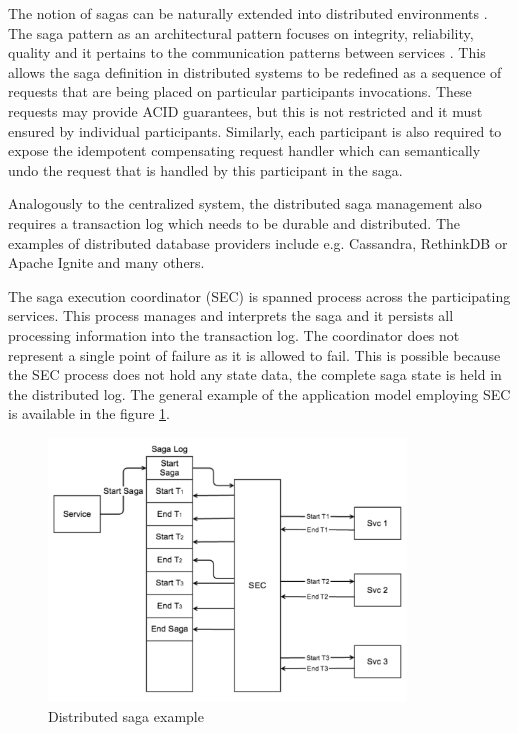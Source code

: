 \documentclass[oneside,
  digital, %
  table,   %
  lof,     %
  lot,     %
]{fithesis3}
\begin{document}
The notion of sagas can be naturally extended into distributed environments \cite{sagas_publ}. The saga pattern as an architectural pattern focuses on integrity, reliability, quality and it pertains to the communication patterns between services \cite{prac_ms}. This allows the saga definition in distributed systems to be redefined as a sequence of requests that are being placed on particular participants invocations. These requests may provide ACID guarantees, but this is not restricted and it must ensured by individual participants. Similarly, each participant is also required to expose the idempotent compensating request handler which can semantically undo the request that is handled by this participant in the saga.

Analogously to the centralized system, the distributed saga management also requires a transaction log which needs to be durable and distributed. The examples of distributed database providers include e.g. Cassandra, RethinkDB or Apache Ignite and many others.

The saga execution coordinator (SEC) is spanned process across the participating services. This process manages and interprets the saga and it persists all processing information into the transaction log. The coordinator does not represent a single point of failure as it is allowed to fail. This is possible because the SEC process does not hold any state data, the complete saga state is held in the distributed log. The general example of the application model employing SEC is available in the figure \ref{fig:SEC}.

\begin{figure}
    \begin{center}
        \includegraphics[height=70mm]{images/SEC.png}
    \end{center}
    \caption{Distributed saga example \cite{applying_saga_pattern}}
    \label{fig:SEC}
\end{figure}
\end{document}
